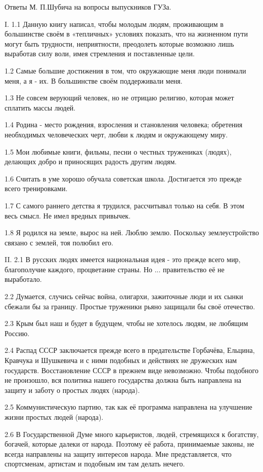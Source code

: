 ﻿Ответы М. П.Шубича на вопросы выпускников ГУЗа.

I.
1.1 Данную книгу написал, чтобы молодым людям, проживающим в большинстве своём в «тепличных» условиях показать, что на жизненном пути могут быть трудности, неприятности, преодолеть которые возможно лишь выработав силу воли, имея стремления и поставленные цели.

1.2 Самые большие достижения в том, что окружающие меня люди понимали меня, а я - их. В большинстве своём поддерживали меня.

1.3 Не совсем верующий человек, но не отрицаю религию, которая может сплатить массы людей.

1.4 Родина - место рождения, взросления и становления человека; обретения необходимых человеческих черт, любви к людям и окружающему миру.

1.5 Мои любимые книги, фильмы, песни о честных тружениках (людях), делающих добро и приносящих радость другим людям.

1.6 Считать в уме хорошо обучала советская школа. Достигается это прежде всего тренировками.

1.7 С самого раннего детства я трудился, рассчитывал только на себя. В этом весь смысл. Не имел вредных привычек.

1.8 Я родился на земле, вырос на ней. Люблю землю. Поскольку землеустройство связано с землей, тоя полюбил его.

II.
2.1 В русских людях имеется национальная идея - это прежде всего мир, благополучие каждого, процветание страны. Но ... правительство её не выработало.

2.2 Думается, случись сейчас война, олигархи, зажиточные люди и их сынки сбежали бы за границу. Простые труженики рьяно защищали бы своё отечество.

2.3 Крым был наш и будет в будущем, чтобы не хотелось людям, не любящим Россию.

2.4 Распад СССР заключается прежде всего в предательстве Горбачёва, Ельцина, Кравчука и Шушкевича и с ними подобных и действиях не дружеских нам государств. Восстановление СССР в прежнем виде невозможно. Чтобы подобного не произошло, вся политика нашего государства должна быть направлена на защиту и заботу о простых людях (народа).

2.5 Коммунистическую партию, так как её программа направлена на улучшение жизни простых людей (народа).

2.6 В Государственной Думе много карьеристов, людей, стремящихся к богатству, богачей, которые далеки от народа. Поэтому её работа, принимаемые законы, не всегда направлены на защиту интересов народа. Мне представляется, что спортсменам, артистам и подобным им там делать нечего.

